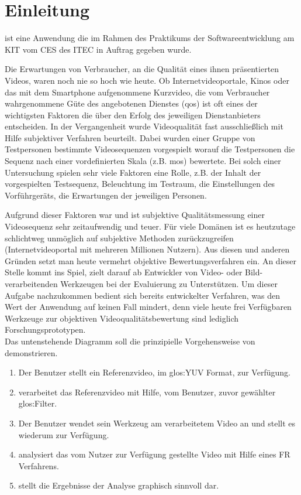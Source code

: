\chapter{Einleitung}

\projektTitel ist eine Anwendung die im Rahmen des Praktikums der Softwareentwicklung am \gls{KIT} vom
\gls{CES} des \gls{ITEC} in Auftrag gegeben wurde. 

Die Erwartungen von Verbraucher, an die Qualität eines ihnen präsentierten Videos, waren noch nie so hoch wie
heute. Ob Internetvideoportale, Kinos  oder das mit dem Smartphone aufgenommene Kurzvideo, die
vom Verbraucher wahrgenommene Güte des angebotenen Dienstes (\gls{qos}) ist oft eines der wichtigsten
Faktoren die über den Erfolg des jeweiligen Dienstanbieters entscheiden. In der Vergangenheit wurde
Videoqualität fast ausschließlich mit Hilfe subjektiver Verfahren beurteilt. Dabei wurden
einer Gruppe von Testpersonen bestimmte Videosequenzen vorgespielt worauf die Testpersonen
die Sequenz nach einer vordefinierten Skala (z.B. \gls{mos}) bewertete. Bei solch einer Untersuchung
spielen sehr viele Faktoren eine Rolle, z.B. der Inhalt der vorgespielten Testsequenz, Beleuchtung
im Testraum, die Einstellungen des Vorführgeräts, die Erwartungen der jeweiligen Personen.

Aufgrund dieser Faktoren war und ist subjektive Qualitätsmessung einer Videosequenz sehr zeitaufwendig und
teuer. Für viele Domänen ist es heutzutage schlichtweg unmöglich auf subjektive Methoden zurückzugreifen
(Internetvideoportal mit mehreren Millionen Nutzern). Aus diesen und anderen Gründen setzt man heute 
vermehrt objektive Bewertungsverfahren ein.
\newpage
An dieser Stelle kommt \projektTitel ins Spiel, \projektTitel zielt darauf ab Entwickler von
Video- oder Bild-verarbeitenden Werkzeugen bei der Evaluierung zu Unterstützen. Um dieser Aufgabe
nachzukommen bedient sich \projektTitel bereits entwickelter Verfahren, was den Wert der Anwendung
auf keinen Fall mindert, denn viele heute frei Verfügbaren Werkzeuge zur objektiven Videoqualitätsbewertung
sind lediglich Forschungsprototypen. \\
Das untenstehende Diagramm soll die prinzipielle Vorgehensweise von \projektTitel demonstrieren.
\begin{enumerate}
\item Der Benutzer stellt \projektTitel ein Referenzvideo, im \gls{glos:YUV} Format, zur Verfügung.
\item \projektTitel verarbeitet das Referenzvideo mit Hilfe, vom Benutzer, zuvor  gewählter \gls{glos:Filter}.
\item Der Benutzer wendet sein Werkzeug am verarbeitetem Video an und stellt es wiederum  \projektTitel zur Verfügung.
\item \projektTitel analysiert das vom Nutzer zur Verfügung gestellte Video mit Hilfe eines \gls{FR} Verfahrens.
\item \projektTitel stellt die Ergebnisse der Analyse graphisch sinnvoll dar.
\end{enumerate}


